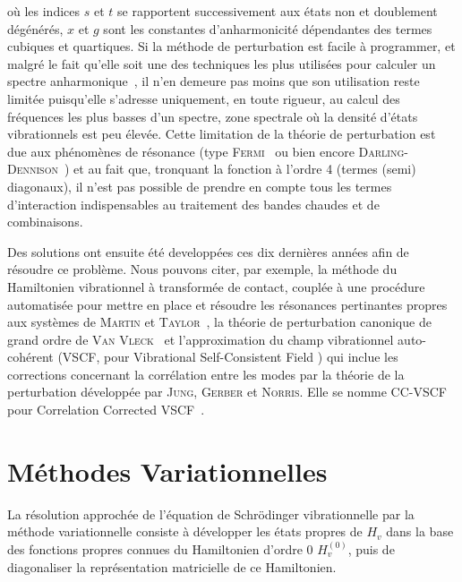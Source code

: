 \noindent où les indices $s$ et $t$ se rapportent successivement aux états non et doublement dégénérés, $x$ et $g$ sont les constantes d'anharmonicité dépendantes des termes cubiques et quartiques. Si la méthode de perturbation est facile à programmer, et malgré le fait qu'elle soit une des techniques les plus utilisées pour calculer un spectre anharmonique~\cite{frisch2015gaussian}, il n'en demeure pas moins que son utilisation reste limitée puisqu'elle s'adresse uniquement, en toute rigueur, au calcul des fréquences les plus basses d'un spectre, zone spectrale où la densité d'états vibrationnels est peu élevée. Cette limitation de la théorie de perturbation est due aux phénomènes de résonance (type \textsc{Fermi}~\cite{fermi1931ramaneffekt} ou bien encore \textsc{Darling-Dennison}~\cite{darling1940water}) et au fait que, tronquant la fonction à l'ordre 4 (termes (semi) diagonaux), il n'est pas possible de prendre en compte tous les termes d'interaction indispensables au traitement des bandes chaudes et de combinaisons.

Des solutions ont ensuite été developpées ces dix dernières années afin de résoudre ce problème. Nous pouvons citer, par exemple, la méthode du Hamiltonien vibrationnel à transformée de contact, couplée à une procédure automatisée pour mettre en place et résoudre les résonances pertinantes propres aux systèmes de \textsc{Martin} et \textsc{Taylor}~\cite{martin1997accurate}, la théorie de perturbation canonique de grand ordre de \textsc{Van Vleck}~\cite{nielsen1951vibration} et l'approximation du champ vibrationnel auto-cohérent (VSCF, pour \og Vibrational Self-Consistent Field \fg{}) qui inclue les corrections concernant la corrélation entre les modes par la théorie de la perturbation développée par \textsc{Jung}, \textsc{Gerber} et \textsc{Norris}. Elle se nomme CC-VSCF pour Correlation Corrected VSCF~\cite{jung1996vibrational,norris1996mo}. 


\section{Méthodes Variationnelles}\label{methodesvariationnelles}

La résolution approchée de l'équation de Schr\"{o}dinger vibrationnelle par la méthode variationnelle consiste à développer les états propres de $H_v$ dans la base des fonctions propres connues du Hamiltonien d'ordre 0 $H^{(0)}_v$, puis de diagonaliser la représentation matricielle de ce Hamiltonien. 

